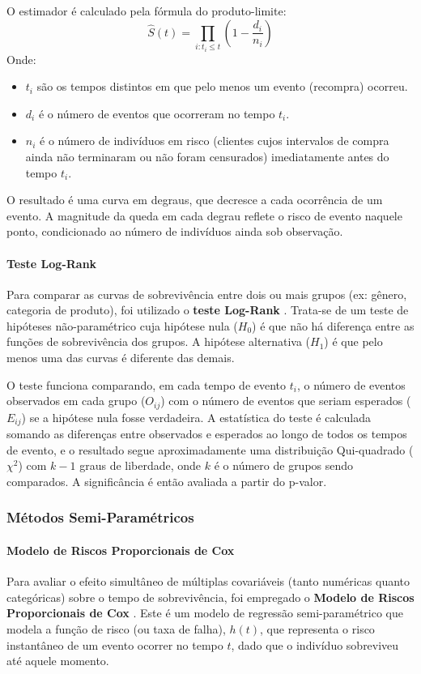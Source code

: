 O estimador é calculado pela fórmula do produto-limite:
\begin{equation}
\hat{S}(t) = \prod_{i: t_i \le t} \left(1 - \frac{d_i}{n_i}\right)
\end{equation}
Onde:
\begin{itemize}
    \item $t_i$ são os tempos distintos em que pelo menos um evento (recompra) ocorreu.
    \item $d_i$ é o número de eventos que ocorreram no tempo $t_i$.
    \item $n_i$ é o número de indivíduos em risco (clientes cujos intervalos de compra ainda não terminaram ou não foram censurados) imediatamente antes do tempo $t_i$.
\end{itemize}

O resultado é uma curva em degraus, que decresce a cada ocorrência de um evento. A magnitude da queda em cada degrau reflete o risco de evento naquele ponto, condicionado ao número de indivíduos ainda sob observação.

\paragraph{Teste Log-Rank}
Para comparar as curvas de sobrevivência entre dois ou mais grupos (ex: gênero, categoria de produto), foi utilizado o \textbf{teste Log-Rank} \cite{mantel_1966}. Trata-se de um teste de hipóteses não-paramétrico cuja hipótese nula ($H_0$) é que não há diferença entre as funções de sobrevivência dos grupos. A hipótese alternativa ($H_1$) é que pelo menos uma das curvas é diferente das demais.

O teste funciona comparando, em cada tempo de evento $t_i$, o número de eventos observados em cada grupo ($O_{ij}$) com o número de eventos que seriam esperados ($E_{ij}$) se a hipótese nula fosse verdadeira. A estatística do teste é calculada somando as diferenças entre observados e esperados ao longo de todos os tempos de evento, e o resultado segue aproximadamente uma distribuição Qui-quadrado ($\chi^2$) com $k-1$ graus de liberdade, onde $k$ é o número de grupos sendo comparados. A significância é então avaliada a partir do p-valor.

\subsubsection{Métodos Semi-Paramétricos}
\paragraph{Modelo de Riscos Proporcionais de Cox}
Para avaliar o efeito simultâneo de múltiplas covariáveis (tanto numéricas quanto categóricas) sobre o tempo de sobrevivência, foi empregado o \textbf{Modelo de Riscos Proporcionais de Cox} \cite{cox_1972}. Este é um modelo de regressão semi-paramétrico que modela a função de risco (ou taxa de falha), $h(t)$, que representa o risco instantâneo de um evento ocorrer no tempo $t$, dado que o indivíduo sobreviveu até aquele momento.

